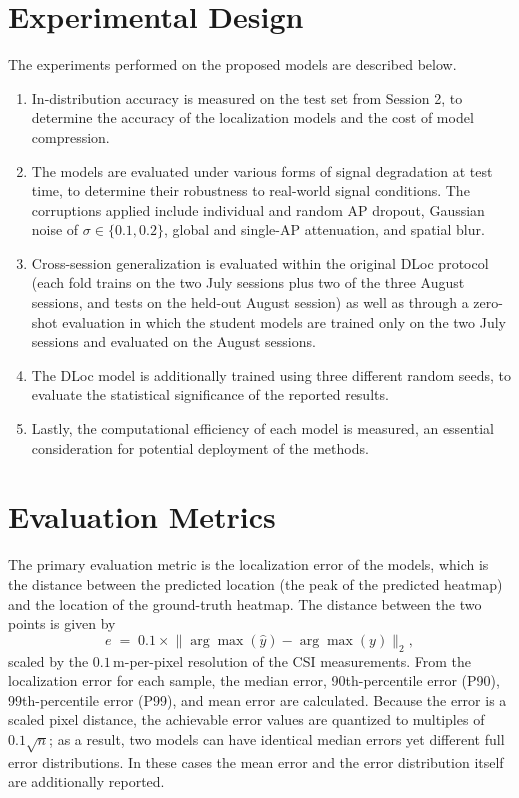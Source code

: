 \section{Experimental Design}
\label{sec:method:design}

The experiments performed on the proposed models are described below.

\begin{enumerate}[leftmargin=2em]
  \item In-distribution accuracy is measured on the test set from Session 2, to determine the accuracy of
  the localization models and the cost of model compression.

  \item The models are evaluated under various forms of signal degradation at test time, to determine
  their robustness to real-world signal conditions. The corruptions applied include individual and random
  AP dropout, Gaussian noise of $\sigma \in \{0.1, 0.2\}$, global and single-AP attenuation, and spatial
  blur.

  \item Cross-session generalization is evaluated within the original DLoc protocol (each fold trains on the two July sessions plus two of the
  three August sessions, and tests on the held-out August session) as well as through a zero-shot evaluation in which the
  student models are trained only on the two July sessions and evaluated on the August sessions.

  \item The DLoc model is additionally trained using three different random seeds, to evaluate the
  statistical significance of the reported results.

  \item Lastly, the computational efficiency of each model is measured, an essential consideration for
  potential deployment of the methods.
\end{enumerate}

\section{Evaluation Metrics}
\label{sec:method:metrics}

The primary evaluation metric is the localization error of the models, which is the distance between the
predicted location (the peak of the predicted heatmap) and the location of the ground-truth heatmap. The
distance between the two points is given by
\begin{equation}
  e \;=\; 0.1 \times \big\lVert \arg\max(\hat{y}) - \arg\max(y) \big\rVert_2 ,
  \label{eq:method:error}
\end{equation}
scaled by the $0.1$\,m-per-pixel resolution of the CSI measurements. From the localization error for each
sample, the median error, 90th-percentile error (P90), 99th-percentile error (P99), and mean error are
calculated. Because the error is a scaled pixel distance, the achievable error values are quantized to
multiples of $0.1\sqrt{n}$; as a result, two models can have identical median errors yet different full
error distributions. In these cases the mean error and the error distribution itself are additionally
reported.
